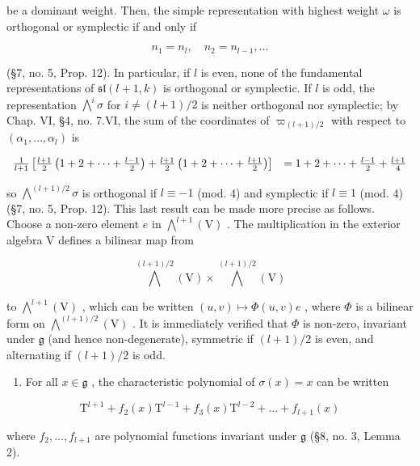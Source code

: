be a dominant weight. Then, the simple representation with highest weight \(\omega\) is orthogonal or symplectic if and only if

\[
n _ {1} = n _ {l}, \quad n _ {2} = n _ {l - 1}, \ldots
\]

(§7, no. 5, Prop. 12). In particular, if \(l\) is even, none of the fundamental representations of \(\mathfrak{sl}(l + 1,k)\) is orthogonal or symplectic. If \(l\) is odd, the representation \(\bigwedge^i\sigma\) for \(i\neq (l + 1) / 2\) is neither orthogonal nor symplectic; by Chap. VI, §4, no. 7.VI, the sum of the coordinates of \(\varpi_{(l + 1) / 2}\) with respect to \((\alpha_{1},\ldots ,\alpha_{l})\) is

\[
\begin{array}{r l} \frac {1}{l + 1} \left[ \frac {l + 1}{2} \left(1 + 2 + \dots + \frac {l - 1}{2}\right) + \frac {l + 1}{2} \left(1 + 2 + \dots + \frac {l + 1}{2}\right) \right] & = 1 + 2 + \dots + \frac {l - 1}{2} + \frac {l + 1}{4} \end{array}
\]

so \(\bigwedge^{(l + 1) / 2}\sigma\) is orthogonal if \(l\equiv -1\) (mod. 4) and symplectic if \(l\equiv 1\) (mod. 4) (§7, no. 5, Prop. 12). This last result can be made more precise as follows. Choose a non-zero element \(e\) in \(\bigwedge^{l + 1}(\mathrm{V})\) . The multiplication in the exterior algebra \(\mathrm{V}\) defines a bilinear map from

\[
\bigwedge^ {(l + 1) / 2} (\mathrm{V}) \times \bigwedge^ {(l + 1) / 2} (\mathrm{V})
\]

to \(\bigwedge^{l + 1}(\mathrm{V})\) , which can be written \((u,v)\mapsto \varPhi (u,v)e\) , where \(\varPhi\) is a bilinear form on \(\bigwedge^{(l + 1) / 2}(\mathrm{V})\) . It is immediately verified that \(\varPhi\) is non-zero, invariant under \(\mathfrak{g}\) (and hence non-degenerate), symmetric if \((l + 1) / 2\) is even, and alternating if \((l + 1) / 2\) is odd.

\begin{enumerate}
\def\labelenumi{(\Roman{enumi})}
\setcounter{enumi}{5}
\tightlist
\item
  For all \(x \in \mathfrak{g}\) , the characteristic polynomial of \(\sigma(x) = x\) can be written
\end{enumerate}

\[
\mathrm{T} ^ {l + 1} + f _ {2} (x) \mathrm{T} ^ {l - 1} + f _ {3} (x) \mathrm{T} ^ {l - 2} + \dots + f _ {l + 1} (x)
\]

where \(f_{2}, \ldots, f_{l+1}\) are polynomial functions invariant under \(\mathfrak{g}\) (§8, no. 3, Lemma 2).

